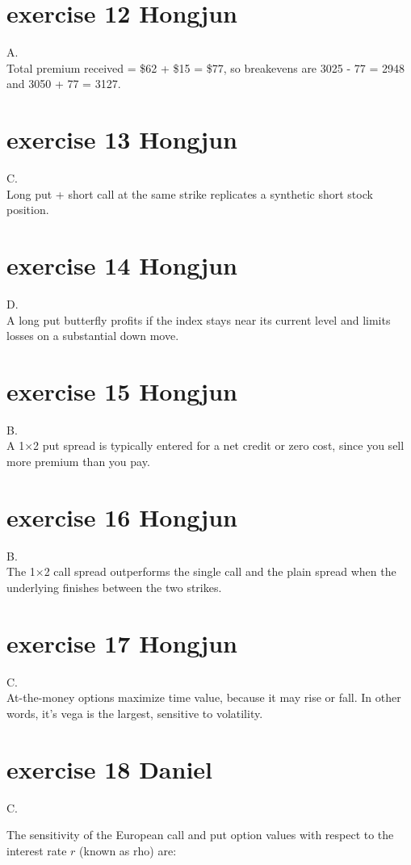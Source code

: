 \documentclass{article}
\begin{document}
\section{exercise 12 Hongjun}
A.\\
Total premium received = \$62 + \$15 = \$77, so breakevens are 3025 - 77 = 2948 and 3050 + 77 = 3127.

\section{exercise 13 Hongjun}
C.\\
Long put + short call at the same strike replicates a synthetic short stock position.

\section{exercise 14 Hongjun}
D.\\
A long put butterfly profits if the index stays near its current level and limits losses on a substantial down move.

\section{exercise 15 Hongjun}
B.\\
A 1×2 put spread is typically entered for a net credit or zero cost, since you sell more premium than you pay.

\section{exercise 16 Hongjun}
B.\\
The 1×2 call spread outperforms the single call and the plain spread when the underlying finishes between the two strikes.

\section{exercise 17 Hongjun}
C.\\
At-the-money options maximize time value, because it may rise or fall. In other words, it’s vega is the largest, sensitive to volatility.

\section{exercise 18 Daniel}
C.

The sensitivity of the European call and put option values with respect to the interest rate \( r \) (known as rho) are:
\end{document}
